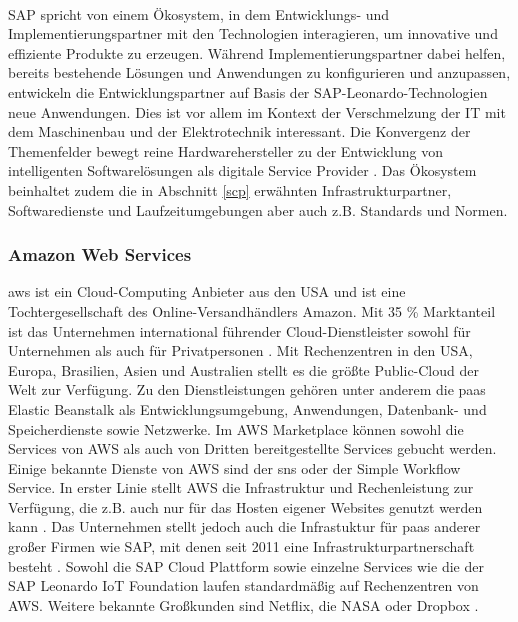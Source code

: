 \\SAP spricht von einem Ökosystem, in dem Entwicklungs- und Implementierungspartner mit den Technologien interagieren, um innovative und effiziente Produkte zu erzeugen. Während Implementierungspartner dabei helfen, bereits bestehende Lösungen und Anwendungen zu konfigurieren und anzupassen, entwickeln die Entwicklungspartner auf Basis der SAP-Leonardo-Technologien neue Anwendungen. Dies ist vor allem im Kontext der Verschmelzung der IT mit dem Maschinenbau und der Elektrotechnik interessant. Die Konvergenz der Themenfelder bewegt reine Hardwarehersteller zu der Entwicklung von intelligenten Softwarelösungen als digitale Service Provider \citep{Elsner2018}. Das Ökosystem beinhaltet zudem die in Abschnitt \ref{scp} erwähnten Infrastrukturpartner, Softwaredienste und Laufzeitumgebungen aber auch z.B. Standards und Normen.


\subsubsection{Amazon Web Services}

\acf{aws} ist ein Cloud-Computing Anbieter aus den USA und ist eine Tochtergesellschaft des Online-Versandhändlers Amazon. Mit 35 \% Marktanteil ist das Unternehmen international führender Cloud-Dienstleister sowohl für Unternehmen als auch für Privatpersonen \citep{awsms2019}. Mit Rechenzentren in den USA, Europa, Brasilien, Asien und Australien stellt es die größte Public-Cloud der Welt zur Verfügung. Zu den Dienstleistungen gehören unter anderem die \ac{paas} Elastic Beanstalk als Entwicklungsumgebung, Anwendungen, Datenbank- und Speicherdienste sowie Netzwerke. Im AWS Marketplace können sowohl die Services von AWS als auch von Dritten bereitgestellte Services gebucht werden. Einige bekannte Dienste von AWS sind der \acf{sns} oder der Simple Workflow Service. In erster Linie stellt AWS die Infrastruktur und Rechenleistung zur Verfügung, die z.B. auch nur für das Hosten eigener Websites genutzt werden kann \citep{AWS}. Das Unternehmen stellt jedoch auch die Infrastuktur für \ac{paas} anderer großer Firmen wie SAP, mit denen seit 2011 eine Infrastrukturpartnerschaft besteht \citep{Elsner2018}. Sowohl die SAP Cloud Plattform sowie einzelne Services wie die der SAP Leonardo IoT Foundation laufen standardmäßig auf Rechenzentren von AWS. Weitere bekannte Großkunden sind Netflix, die NASA oder Dropbox \citep{awsms2019}.



\newpage
